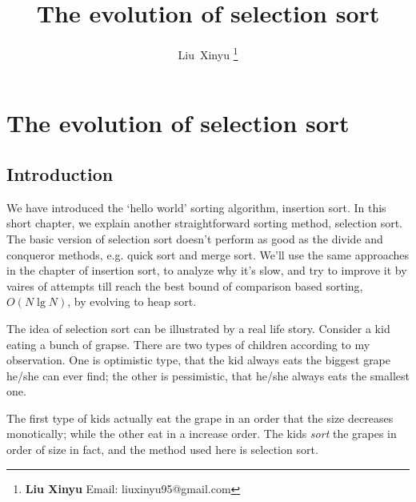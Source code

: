 \documentclass{article}
\begin{document}
\fi


\title{The evolution of selection sort}

\author{Liu~Xinyu
\thanks{{\bfseries Liu Xinyu } \newline
  Email: liuxinyu95@gmail.com \newline}
  }


\maketitle

\ifx\wholebook\relax
\chapter{The evolution of selection sort}
\fi

\section{Introduction}
\label{introduction} 
We have introduced the `hello world' sorting algorithm, insertion
sort. In this short chapter, we explain another straightforward
sorting method, selection sort. The basic version of
selection sort doesn't perform as good as the divide and conqueror
methods, e.g. quick sort and merge sort. We'll use
the same approaches in the chapter of insertion sort, to 
analyze why it's slow, and try to improve it by vaires of
attempts till reach the best bound of comparison
based sorting, $O(N \lg N)$, by evolving to heap sort.

The idea of selection sort can be illustrated by a real life
story. Consider a kid eating a bunch of grapse. There are two
types of children according to my observation. One is optimistic
type, that the kid always eats the biggest grape he/she can ever
find; the other is pessimistic, that he/she always eats the
smallest one.

The first type of kids actually eat the grape in an order that
the size decreases monotically; while the other eat in a increase
order. The kids {\em sort} the grapes in order of size in fact,
and the method used here is selection sort.
\end{document}
